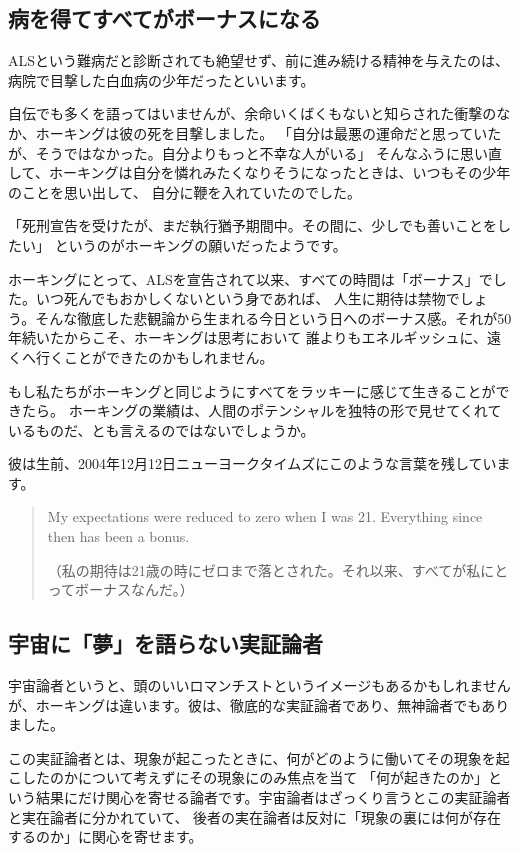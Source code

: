 \documentclass[10pt,b5paper,papersize,dvipdfmx]{jsbook}
\begin{document}
\subsection{病を得てすべてがボーナスになる}
ALSという難病だと診断されても絶望せず、前に進み続ける精神を与えたのは、病院で目撃した白血病の少年だったといいます。\par
自伝でも多くを語ってはいませんが、余命いくばくもないと知らされた衝撃のなか、ホーキングは彼の死を目撃しました。
「自分は最悪の運命だと思っていたが、そうではなかった。自分よりもっと不幸な人がいる」
そんなふうに思い直して、ホーキングは自分を憐れみたくなりそうになったときは、いつもその少年のことを思い出して、
自分に鞭を入れていたのでした。\par
「死刑宣告を受けたが、まだ執行猶予期間中。その間に、少しでも善いことをしたい」
というのがホーキングの願いだったようです。\par
ホーキングにとって、ALSを宣告されて以来、すべての時間は「ボーナス」でした。いつ死んでもおかしくないという身であれば、
人生に期待は禁物でしょう。そんな徹底した悲観論から生まれる今日という日へのボーナス感。それが50年続いたからこそ、ホーキングは思考において
誰よりもエネルギッシュに、遠くへ行くことができたのかもしれません。\par
もし私たちがホーキングと同じようにすべてをラッキーに感じて生きることができたら。
ホーキングの業績は、人間のポテンシャルを独特の形で見せてくれているものだ、とも言えるのではないでしょうか。\par
彼は生前、2004年12月12日ニューヨークタイムズにこのような言葉を残しています。\par
\begin{quote}
My expectations were reduced to zero when I was 21. Everything since then has been a bonus.\par
（私の期待は21歳の時にゼロまで落とされた。それ以来、すべてが私にとってボーナスなんだ。）
\end{quote}

\subsection{宇宙に「夢」を語らない実証論者}
宇宙論者というと、頭のいいロマンチストというイメージもあるかもしれませんが、ホーキングは違います。彼は、徹底的な実証論者であり、無神論者でもありました。\par
この実証論者とは、現象が起こったときに、何がどのように働いてその現象を起こしたのかについて考えずにその現象にのみ焦点を当て
「何が起きたのか」という結果にだけ関心を寄せる論者です。宇宙論者はざっくり言うとこの実証論者と実在論者に分かれていて、
後者の実在論者は反対に「現象の裏には何が存在するのか」に関心を寄せます。\par
\end{document}
